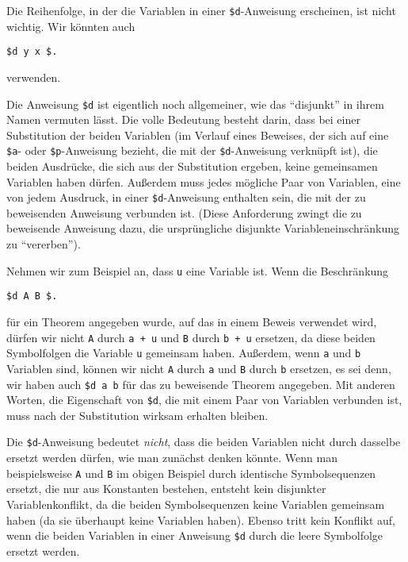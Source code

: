 Die Reihenfolge, in der die Variablen in einer \texttt{\$d}-Anweisung erscheinen, ist nicht wichtig.  Wir könnten auch
\begin{center}
  \texttt{\$d y x \$.}
\end{center}
verwenden.

Die Anweisung \texttt{\$d} ist eigentlich noch allgemeiner, wie das "`disjunkt"' in ihrem Namen vermuten lässt.  Die volle Bedeutung besteht darin, dass bei einer Substitution der beiden Variablen (im Verlauf eines Beweises, der sich auf eine \texttt{\$a}- oder \texttt{\$p}-Anweisung bezieht, die mit der \texttt{\$d}-Anweisung verknüpft ist), die beiden Ausdrücke, die sich aus der Substitution ergeben, keine gemeinsamen Variablen haben dürfen.  Außerdem muss jedes mögliche Paar von Variablen, eine von jedem Ausdruck, in einer \texttt{\$d}-Anweisung enthalten sein, die mit der zu beweisenden Anweisung verbunden ist.  (Diese Anforderung zwingt die zu beweisende Anweisung dazu, die ursprüngliche disjunkte Variableneinschränkung zu "`vererben"').

Nehmen wir zum Beispiel an, dass \texttt{u} eine Variable ist.  Wenn die Beschränkung
\begin{center}
  \texttt{\$d A B \$.}
\end{center}
für ein Theorem angegeben wurde, auf das in einem
Beweis verwendet wird, dürfen wir nicht \texttt{A} durch \mbox{\tt a + u} und
\texttt{B} durch \mbox{\tt b + u} ersetzen, da diese beiden Symbolfolgen die
Variable \texttt{u} gemeinsam haben.  Außerdem, wenn \texttt{a} und \texttt{b} Variablen sind, können wir nicht \texttt{A} durch \texttt{a} und \texttt{B} durch \texttt{b} ersetzen, es sei denn, wir haben auch \texttt{\$d a b} für das zu beweisende Theorem angegeben. Mit anderen Worten, die Eigenschaft von \texttt{\$d}, die mit einem Paar von Variablen verbunden ist, muss nach der Substitution wirksam erhalten bleiben.

Die \texttt{\$d}-Anweisung bedeutet {\em nicht}, dass die beiden Variablen nicht durch dasselbe ersetzt werden dürfen, wie man zunächst denken könnte.  Wenn man beispielsweise \texttt{A} und \texttt{B} im obigen Beispiel durch identische Symbolsequenzen ersetzt, die nur aus Konstanten bestehen, entsteht kein disjunkter Variablenkonflikt, da die beiden Symbolsequenzen keine Variablen gemeinsam haben (da sie überhaupt keine Variablen haben).  Ebenso tritt kein Konflikt auf, wenn die beiden Variablen in einer Anweisung \texttt{\$d} durch die leere Symbolfolge ersetzt werden.

